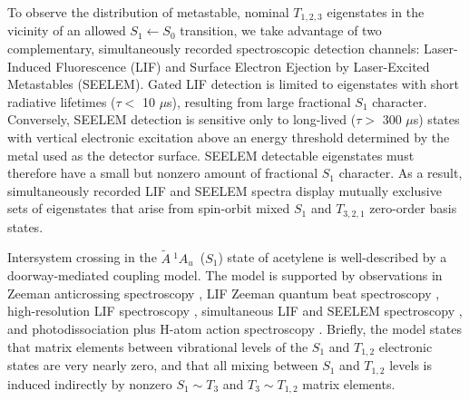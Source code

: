 \documentclass[12pt]{mitthesis}
\newcommand{\rcm}{cm$^{-1}$}
\newcommand{\astate}{$
  \tilde{A} \: ^1\!A_u
  $}
\newcommand{\microsec}{$\mu$s}
\begin{document}
To observe the distribution of metastable, nominal $T_{1,2,3}$
eigenstates in the vicinity of an allowed $S_1 \leftarrow S_0$
transition, we take advantage of two complementary, simultaneously
recorded spectroscopic detection channels: Laser-Induced Fluorescence
(LIF) and Surface Electron Ejection by Laser-Excited Metastables
(SEELEM).  Gated LIF detection is limited to eigenstates with short
radiative lifetimes ($\tau <$ 10 \microsec), resulting from large
fractional $S_1$ character.  Conversely, SEELEM detection is sensitive
only to long-lived ($\tau >$ 300 \microsec) states with vertical
electronic excitation above an energy threshold determined by the
metal used as the detector surface.  SEELEM detectable eigenstates
must therefore have a small but nonzero amount of fractional $S_1$
character.  As a result, simultaneously recorded LIF and SEELEM
spectra display mutually exclusive sets of eigenstates that arise from
spin-orbit mixed $S_1$ and $T_{3,2,1}$ zero-order basis states.

 
Intersystem crossing in the \astate\ ($S_1$) state of acetylene is
well-described by a doorway-mediated coupling model.  The model is
supported by observations in Zeeman anticrossing spectroscopy
\cite{dupre91, dupre95a, dupre95b}, LIF Zeeman quantum beat
spectroscopy \cite{ochi87, ochi91, dupre93}, high-resolution LIF
spectroscopy \cite{drabbels94, altunata01}, simultaneous LIF and
SEELEM spectroscopy \cite{humphrey97, altunata00, mishra04}, and
photodissociation plus H-atom action spectroscopy \cite{yamakita03,
  loffler98, mordaunt98}.  Briefly, the model states that matrix
elements between vibrational levels of the $S_1$ and $T_{1,2}$
electronic states are very nearly zero, and that all mixing between
$S_1$ and $T_{1,2}$ levels is induced indirectly by nonzero $S_1 \sim
T_3$ and $T_3 \sim T_{1,2}$ matrix elements.

\end{document}
